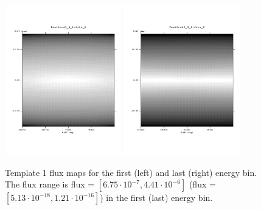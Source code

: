 \documentclass{article}
\begin{document}
\begin{figure}
\centering
\includegraphics[trim = 50 100 70 100, clip = true, width=0.45\textwidth]{figs/Template_maps/Template1_Ebin01}
\includegraphics[trim = 50 100 70 100, clip = true, width=0.45\textwidth]{figs/Template_maps/Template1_Ebin71}
\caption{Template 1 flux maps for the first (left) and last (right) energy bin. The flux range is flux = $[6.75 \cdot 10^{-7}, 4.41 \cdot 10^{-6}]$ (flux = $[5.13 \cdot 10^{-18}, 1.21 \cdot 10^{-16}]$) in the first (last) energy bin.}
\label{TM1}
\end{figure}
\end{document}
